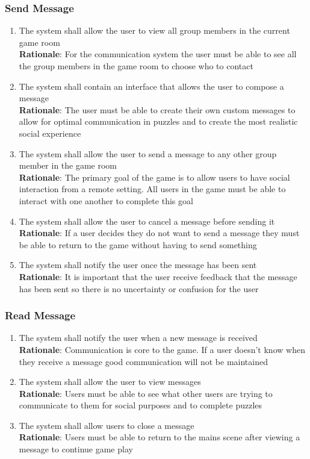 \documentclass[12pt]{article}
\begin{document}
\subsubsection{Send Message}
    \begin{enumerate}[label=SM\arabic*., series=SendMessage]
        \item The system shall allow the user to view all group members in the current game room\\
        \textbf{Rationale}: For the communication system the user must be able to see all the group members in the game room to choose who to contact
        \item The system shall contain an interface that allows the user to compose a message\\
        \textbf{Rationale}: The user must be able to create their own custom messages to allow for optimal communication in puzzles and to create the most realistic social experience
        \item The system shall allow the user to send a message to any other group member in the game room\\
        \textbf{Rationale}: The primary goal of the game is to allow users to have social interaction from a remote setting. All users in the game must be able to interact with one another to complete this goal
        \item The system shall allow the user to cancel a message before sending it\\
        \textbf{Rationale}: If a user decides they do not want to send a message they must be able to return to the game without having to send something
        \item The system shall notify the user once the message has been sent\\
        \textbf{Rationale}: It is important that the user receive feedback that the message has been sent so there is no uncertainty or confusion for the user
    \end{enumerate}
\subsubsection{Read Message}
    \begin{enumerate}[label=RM\arabic*., series=ReadMessage]
        \item The system shall notify the user when a new message is received\\
        \textbf{Rationale}: Communication is core to the game. If a user doesn't know when they receive a message good communication will not be maintained
        \item The system shall allow the user to view messages\\
        \textbf{Rationale}: Users must be able to see what other users are trying to communicate to them for social purposes and to complete puzzles
        \item The system shall allow users to close a message\\
        \textbf{Rationale}: Users must be able to return to the mains scene after viewing a message to continue game play
    \end{enumerate}
\end{document}
